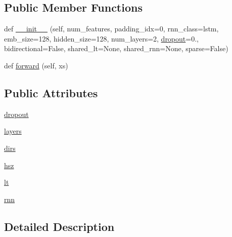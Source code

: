 \subsection*{Public Member Functions}
\begin{DoxyCompactItemize}
\item 
def \hyperlink{classparlai_1_1agents_1_1legacy__agents_1_1seq2seq_1_1modules__v0_1_1Encoder_a154b3230fa137794b1839db9642360ba}{\+\_\+\+\_\+init\+\_\+\+\_\+} (self, num\+\_\+features, padding\+\_\+idx=0, rnn\+\_\+class=\textquotesingle{}lstm\textquotesingle{}, emb\+\_\+size=128, hidden\+\_\+size=128, num\+\_\+layers=2, \hyperlink{classparlai_1_1agents_1_1legacy__agents_1_1seq2seq_1_1modules__v0_1_1Encoder_a163f618759e34a79a088ee707078f007}{dropout}=0., bidirectional=False, shared\+\_\+lt=None, shared\+\_\+rnn=None, sparse=False)
\item 
def \hyperlink{classparlai_1_1agents_1_1legacy__agents_1_1seq2seq_1_1modules__v0_1_1Encoder_a53c7f1b88916692c14fa744077b3bd77}{forward} (self, xs)
\end{DoxyCompactItemize}
\subsection*{Public Attributes}
\begin{DoxyCompactItemize}
\item 
\hyperlink{classparlai_1_1agents_1_1legacy__agents_1_1seq2seq_1_1modules__v0_1_1Encoder_a163f618759e34a79a088ee707078f007}{dropout}
\item 
\hyperlink{classparlai_1_1agents_1_1legacy__agents_1_1seq2seq_1_1modules__v0_1_1Encoder_ade7bafa8cbfe35093ebb2813fad9b8e9}{layers}
\item 
\hyperlink{classparlai_1_1agents_1_1legacy__agents_1_1seq2seq_1_1modules__v0_1_1Encoder_a35141680cd7a71fbf61f60ce2d515a4c}{dirs}
\item 
\hyperlink{classparlai_1_1agents_1_1legacy__agents_1_1seq2seq_1_1modules__v0_1_1Encoder_ad23bedb1c44da264f0916883a9458a61}{hsz}
\item 
\hyperlink{classparlai_1_1agents_1_1legacy__agents_1_1seq2seq_1_1modules__v0_1_1Encoder_a69293e2d89c3b6fc6ccfffaa80fb651b}{lt}
\item 
\hyperlink{classparlai_1_1agents_1_1legacy__agents_1_1seq2seq_1_1modules__v0_1_1Encoder_adced0493c6365cc7c123b848858f047d}{rnn}
\end{DoxyCompactItemize}


\subsection{Detailed Description}


